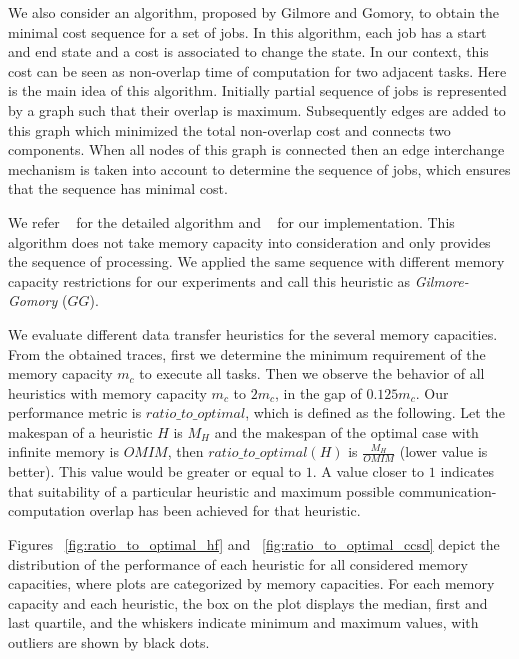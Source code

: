 \documentclass[sigconf]{acmart}
\begin{document}
{	%
	We also consider an algorithm, proposed by Gilmore and Gomory, to obtain the minimal cost sequence for a set of jobs. In this algorithm, each job has a start and end state and a cost is associated to change the state. In our context, this cost can be seen as non-overlap time of computation for two adjacent tasks. Here is the main idea of this algorithm. Initially partial sequence of jobs is represented by a graph such that their overlap is maximum. Subsequently edges are added to this graph which minimized the total non-overlap cost  and connects two components. When all nodes of this graph is connected then an edge interchange mechanism is taken into account to determine the sequence of jobs, which ensures that the sequence has minimal cost.
	
	We refer ~\cite{Gilmore-Gomory:1964} for the detailed algorithm and ~\cite{gitworkrepo} for our implementation. This algorithm does not take memory capacity into consideration and only provides the sequence of processing. We applied the same sequence with different memory capacity restrictions for our experiments and call this heuristic as \textit{Gilmore-Gomory} ($GG$).
	
	
	
	We evaluate different data transfer heuristics for the several memory capacities. From the obtained traces, first we determine the minimum requirement of the memory capacity $m_c$ to execute all tasks. Then we observe the behavior of all heuristics with memory capacity  $m_c$ to $2m_c$, in the gap of $0.125m_c$. Our performance metric is $ratio\_to\_optimal$, which is defined as the following. Let the makespan of a heuristic $H$ is $M_H$ and the makespan of the optimal  case with infinite memory is $OMIM$, then  $ratio\_to\_optimal (H)$ is $\frac{M_H}{OMIM}$ (lower value is better). This value would be  greater or equal to $1$. A value closer to $1$ indicates that suitability of a particular heuristic and maximum possible communication-computation overlap has been achieved for that heuristic.
	
	
	Figures ~\ref{fig:ratio_to_optimal_hf} and ~\ref{fig:ratio_to_optimal_ccsd} depict the distribution of the performance  of each heuristic for all considered memory capacities, where plots are categorized by memory capacities. For each memory capacity and each heuristic, the box on the plot displays the median, first and last quartile, and the whiskers indicate minimum and maximum values, with outliers are shown by black dots.
}
\end{document}
